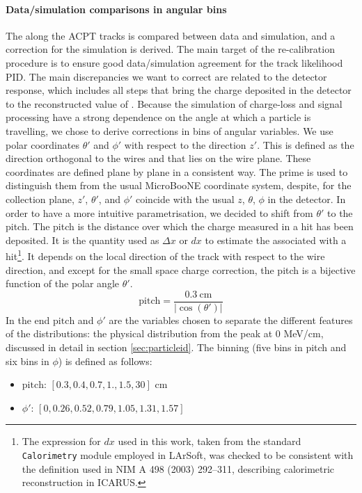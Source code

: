 \paragraph{Data/simulation comparisons in angular bins}
The \dqdx along the ACPT tracks is compared between data and simulation, and a correction for the simulation is derived.
The main target of the re-calibration procedure is to ensure good data/simulation agreement for the track likelihood PID.
The main discrepancies we want to correct are related to the detector response, which includes all steps that bring the charge deposited in the detector to the reconstructed value of \dqdx.
Because the simulation of charge-loss and signal processing have a strong dependence on the angle at which a particle is travelling, we chose to derive corrections in bins of angular variables.
We use polar coordinates $\theta'$ and $\phi'$ with respect to the direction $z'$.
This is defined as the direction orthogonal to the wires and that lies on the wire plane.
These coordinates are defined plane by plane in a consistent way.
The prime is used to distinguish them from the usual MicroBooNE coordinate system, despite, for the collection plane, $z'$, $\theta'$, and $\phi'$ coincide with the usual $z$, $\theta$, $\phi$ in the detector.
In order to have a more intuitive parametrisation, we decided to shift from $\theta'$ to the pitch.
The pitch is the distance over which the charge measured in a hit has been deposited.
It is the quantity used as $\Delta x$ or $dx$ to estimate the \dedx associated with a hit\footnote{The expression for $dx$ used in this work, taken from the standard \texttt{Calorimetry} module employed in LArSoft, was checked to be consistent with the definition used in NIM A 498 (2003) 292–311, describing calorimetric reconstruction in ICARUS.}.
It depends on the local direction of the track with respect to the wire direction, and except for the small space charge correction, the pitch is a bijective function of the polar angle $\theta'$.
\[ \text{pitch} = \frac{0.3~\text{cm}}{|\cos(\theta')|} \]
In the end $\text{pitch}$ and $\phi'$ are the variables chosen to separate the different features of the \dedx distributions: the physical \dedx distribution from the peak at 0 MeV/cm, discussed in detail in section \ref{sec:particleid}.
The binning (five bins in pitch and six bins in $\phi$) is defined as follows:
\begin{itemize}
    \item $\text{pitch}$: $[0.3, 0.4, 0.7, 1., 1.5, 30]$ cm
    \item $\phi'$: $[0, 0.26, 0.52, 0.79, 1.05, 1.31, 1.57]$
\end{itemize}

